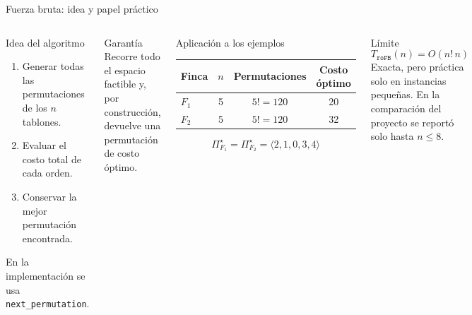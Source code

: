 \documentclass[aspectratio=169]{beamer}
\begin{document}
\begin{frame}{Fuerza bruta: idea y papel pr\'actico}
  \begin{columns}[T,onlytextwidth]
    \scriptsize
    \begin{block}{Idea del algoritmo}
      \begin{enumerate}
        \item Generar todas las permutaciones de los \(n\) tablones.
        \item Evaluar el costo total de cada orden.
        \item Conservar la mejor permutaci\'on encontrada.
      \end{enumerate}
      En la implementaci\'on se usa \texttt{next\_permutation}.
    \end{block}

    \begin{alertblock}{Garant\'ia}
      Recorre todo el espacio factible y, por construcci\'on, devuelve una permutaci\'on de costo \'optimo.
    \end{alertblock}

    \scriptsize
    \begin{block}{Aplicaci\'on a los ejemplos}
      \begin{tabular}{@{}lccc@{}}
        \toprule
        Finca & \(n\) & Permutaciones & Costo \'optimo \\
        \midrule
        \(F_1\) & 5 & \(5!=120\) & 20 \\
        \(F_2\) & 5 & \(5!=120\) & 32 \\
        \bottomrule
      \end{tabular}
      \[
      \Pi^\star_{F_1}=\Pi^\star_{F_2}=\langle 2,1,0,3,4\rangle
      \]
    \end{block}

    \begin{block}{L\'imite}
      \[
      T_{\texttt{roFB}}(n)=O(n!\,n)
      \]
      Exacta, pero pr\'actica solo en instancias peque\~nas. En la comparaci\'on del proyecto se report\'o solo hasta \(n\le 8\).
    \end{block}
  \end{columns}
\end{frame}
\end{document}
